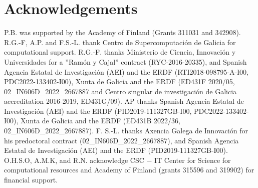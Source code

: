 \documentclass[fleqn,10pt]{wlscirep}
\begin{document}








\section*{Acknowledgements}

P.B. was supported by the Academy of Finland (Grants 311031 and 342908).
R.G.-F, A.P. and F.S.-L. thank Centro de Supercomputación de Galicia for computational support.
R.G.-F. thanks Ministerio de Ciencia, Innovaci{\'o}n y Universidades for a ''Ram{\'o}n y Cajal'' contract (RYC-2016-20335), and Spanish Agencia Estatal de Investigaci{\'o}n (AEI) and the ERDF (RTI2018-098795-A-I00, PDC2022-133402-I00), Xunta de Galicia and the ERDF (ED431F 2020/05, 02\_IN606D\_2022\_2667887 and Centro singular de investigaci{\'o}n de Galicia accreditation 2016-2019, ED431G/09). 
AP thanks Spanish Agencia Estatal de Investigaci{\'o}n (AEI) and the ERDF (PID2019-111327GB-I00, PDC2022-133402-I00), Xunta de Galicia and the ERDF (ED431B 2022/36, 02\_IN606D\_2022\_2667887).
F. S.-L. thanks Axencia Galega de Innovaci{\'o}n for his predoctoral contract (02\_IN606D\_2022\_2667887), and Spanish Agencia Estatal de Investigaci{\'o}n (AEI) and the ERDF (PID2019-111327GB-I00). 
O.H.S.O, A.M.K, and R.N. acknowledge CSC − IT Center for Science for computational resources and Academy of Finland (grants 315596 and 319902) for ﬁnancial support.
\end{document}
